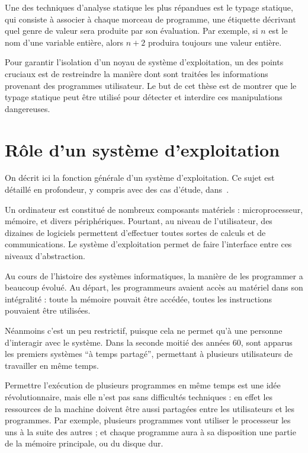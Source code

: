 Une des techniques d'analyse statique les plus répandues est le typage statique,
qui consiste à associer à chaque morceau de programme, une étiquette
décrivant quel genre de valeur sera produite par son évaluation. Par exemple, si
$n$ est le nom d'une variable entière, alors $n + 2$ produira toujours une
valeur entière.

Pour garantir l'isolation d'un noyau de système d'exploitation, un des points
cruciaux est de restreindre la manière dont sont traitées les informations
provenant des programmes utilisateur. Le but de cet thèse est de montrer que le
typage statique peut être utilisé pour détecter et interdire ces manipulations
dangereuses.

\section{Rôle d'un système d'exploitation}

On décrit ici la fonction générale d'un système d'exploitation. Ce sujet est
détaillé en profondeur, y compris avec des cas d'étude, dans~\cite{tanenbaum}.

Un ordinateur est constitué de nombreux composants matériels : microprocesseur,
mémoire, et divers périphériques. Pourtant, au niveau de l'utilisateur, des
dizaines de logiciels permettent d'effectuer toutes sortes de calculs et de
communications. Le système d'exploitation permet de faire l'interface entre ces
niveaux d'abstraction.

Au cours de l'histoire des systèmes informatiques, la manière de les programmer
a beaucoup évolué. Au départ, les programmeurs avaient accès au matériel dans
son intégralité : toute la mémoire pouvait être accédée, toutes les instructions
pouvaient être utilisées.

Néanmoins c'est un peu restrictif, puisque cela ne permet qu'à une personne
d'interagir avec le système. Dans la seconde moitié des années 60, sont apparus
les premiers systèmes ``à temps partagé'', permettant à plusieurs utilisateurs
de travailler en même temps.

Permettre l'exécution de plusieurs programmes en même temps est une idée
révolutionnaire, mais elle n'est pas sans difficultés techniques : en effet les
ressources de la machine doivent être aussi partagées entre les utilisateurs et
les programmes. Par exemple, plusieurs programmes vont utiliser le processeur
les uns à la suite des autres ; et chaque programme aura à sa disposition une
partie de la mémoire principale, ou du disque dur.

